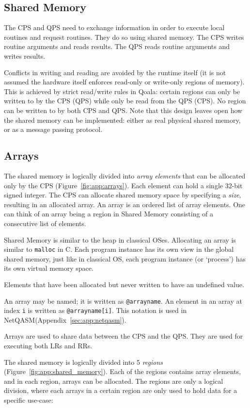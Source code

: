 \subsection{Shared Memory}
\label{sec:app:shared_memory}
The CPS and QPS need to exchange information in order to execute local routines and request routines. They do so using shared memory.
The CPS writes routine arguments and reads results.
The QPS reads routine arguments and writes results.

Conflicts in writing and reading are avoided by the runtime itself (it is not assumed the hardware itself enforces read-only or write-only regions of memory).
This is achieved by strict read/write rules in Qoala: certain regions can only be written to by the CPS (QPS) while only be read from the QPS (CPS).
No region can be written to by both CPS and QPS.
Note that this design leaves open how the shared memory can be implemented: either as real physical shared memory, or as a message passing protocol.


\subsection{Arrays}
The shared memory is logically divided into \textit{array elements} that can be allocated only by the CPS (Figure~\ref{fig:app:arrays}).
Each element can hold a single 32-bit signed integer.
The CPS can allocate shared memory space by specifying a \textit{size}, resulting in an allocated array.
An array is an ordered list of array elements. 
One can think of an array being a region in Shared Memory consisting of a consecutive list of elements.

Shared Memory is similar to the heap in classical OSes. Allocating an array is similar to \texttt{malloc} in C. Each program instance has its own view in the global shared memory, just like in classical OS, each program instance (or `process') has its own virtual memory space.

Elements that have been allocated but never written to have an undefined value.

An array may be named; it is written as \texttt{@arrayname}. An element in an array at index \texttt{i} is written as \texttt{@arrayname[i]}. This notation is used in NetQASM(Appendix~\ref{sec:app:netqasm}).

Arrays are used to share data between the CPS and the QPS.
They are used for executing both LRs and RRs.

The shared memory is logically divided into 5 \textit{regions} (Figure~\ref{fig:app:shared_memory}).
Each of the regions contains array elements, and in each region, arrays can be allocated.
The regions are only a logical division, where each arrays in a certain region are only used to hold data for a specific use-case:

